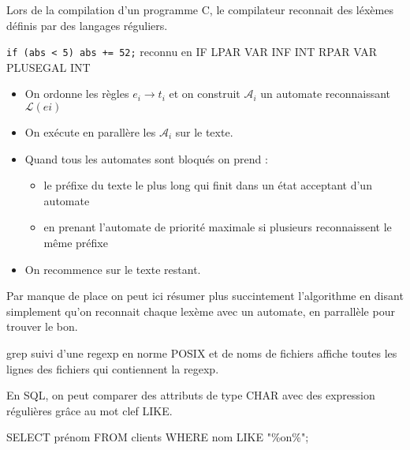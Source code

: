 \begin{appl}
	Lors de la compilation d'un programme C, le compilateur reconnait des léxèmes définis par des langages réguliers.
\end{appl}

\begin{example}
	\texttt{if (abs < 5) abs += 52;} reconnu en IF LPAR VAR INF INT RPAR VAR PLUSEGAL INT
\end{example}

\begin{algo} \enspace
	\begin{itemize}[label=$\bullet$]
		\item On ordonne les règles $e_i \to t_i$ et on construit $\mathcal A_i$ un automate reconnaissant $\mathcal L(ei)$
		\item On exécute en parallère les $\mathcal A_i$ sur le texte.
		\item Quand tous les automates sont bloqués on prend : \begin{itemize}
			\item le préfixe du texte le plus long qui finit dans un état acceptant d'un automate
			\item en prenant l'automate de priorité maximale si plusieurs reconnaissent le même préfixe
		\end{itemize}
		\item On recommence sur le texte restant. 
	\end{itemize}
\end{algo}

\begin{com}
	Par manque de place on peut ici résumer plus succintement l'algorithme en disant simplement qu'on reconnait chaque lexème avec un automate, en parrallèle pour trouver le bon.
\end{com}

\begin{appl}
	grep suivi d'une regexp en norme POSIX et de noms de fichiers affiche toutes les lignes des fichiers qui contiennent la regexp. 
\end{appl}

\begin{appl}
	En SQL, on peut comparer des attributs de type CHAR avec des expression régulières grâce au mot clef LIKE.
\end{appl}

\begin{example}
	SELECT prénom FROM clients WHERE nom LIKE "\%on\%";
\end{example}
